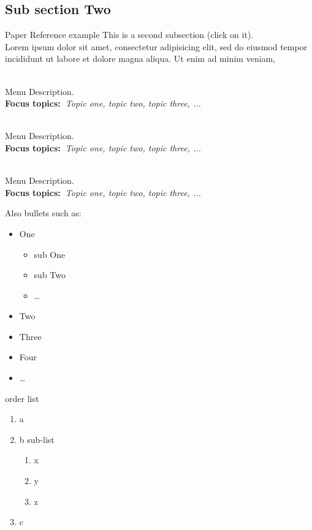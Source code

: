   \subsection{Sub section Two}

  Paper Reference example This is a second subsection (click on it)\cite{bazerman1988shaping}. ~\\
  
  Lorem ipsum dolor sit amet, consectetur adipisicing elit, sed do eiusmod
  tempor incididunt ut labore et dolore magna aliqua. Ut enim ad minim veniam,

  \begin{description}\addtolength{\itemsep}{-0.35\baselineskip}%
  
    \item[\textbullet~\bfseries Menu Item] \hfill \\%
      Menu Description.~\\%
      {\textbf{Focus topics:~}\emph{Topic one, topic two, topic three, ...}}%
    
    \item[\textbullet~\bfseries Menu Item] \hfill \\%
      Menu Description.~\\%
      {\textbf{Focus topics:~}\emph{Topic one, topic two, topic three, ...}}%
    
    
    \item[\textbullet~\bfseries Menu Item] \hfill \\%
      Menu Description.~\\%
      {\textbf{Focus topics:~}\emph{Topic one, topic two, topic three, ...}}%
  
  \end{description}
  Also bullets such as:%
  \begin{itemize}\addtolength{\itemsep}{-0.35\baselineskip}%
    \item One%
        \begin{itemize}\addtolength{\itemsep}{-0.35\baselineskip}%
        \item sub One%
        \item sub Two%
        \item \ldots%
        \end{itemize}%
    \item Two%
    \item Three%
    \item Four%
    \item \ldots%
  \end{itemize}%
  
  
  order list
  \begin{enumerate}
      \item a
      \item b
       sub-list
            \begin{enumerate}
              \item x
              \item y
              \item z
            \end{enumerate}
      \item c
  \end{enumerate}
 
